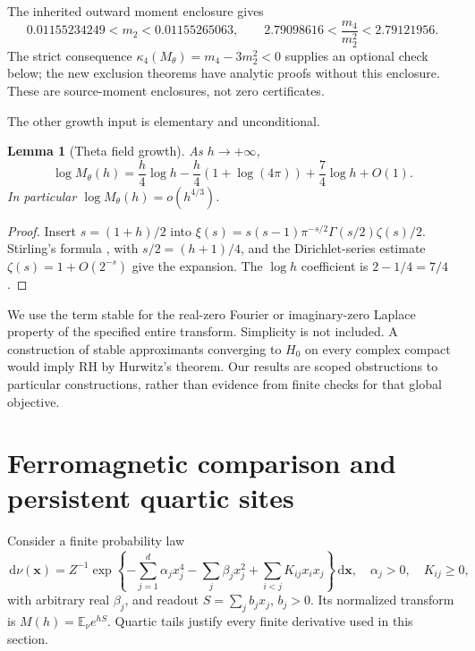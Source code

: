 \documentclass[11pt]{article}
\newtheorem{lemma}[theorem]{Lemma}
\theoremstyle{remark}
\newcommand{\E}{\mathbb E}
\newcommand{\dd}{\,\mathrm d}
\numberwithin{equation}{section}
\begin{document}
The inherited outward moment enclosure \cite{scout} gives
\begin{equation}\label{eq:moments}
 0.01155234249<m_2<0.01155265063,\qquad
 2.79098616<\frac{m_4}{m_2^2}<2.79121956.
\end{equation}
The strict consequence
\(\kappa_4(M_\theta)=m_4-3m_2^2<0\) supplies an optional check below;
the new exclusion theorems have analytic proofs without this enclosure.
These are source-moment enclosures, not zero certificates.

The other growth input is elementary and unconditional.
\begin{lemma}[Theta field growth]\label{lem:theta}
As \(h\to+\infty\),
\begin{equation}\label{eq:theta-growth}
\log M_\theta(h)
 =\frac h4\log h-\frac h4(1+\log(4\pi))
  +\frac74\log h+O(1).
\end{equation}
In particular \(\log M_\theta(h)=o(h^{4/3})\).
\end{lemma}
\begin{proof}
Insert \(s=(1+h)/2\) into
\(\xi(s)=s(s-1)\pi^{-s/2}\Gamma(s/2)\zeta(s)/2\).
Stirling's formula \cite[5.11.1]{dlmf}, with \(s/2=(h+1)/4\), and the
Dirichlet-series estimate \(\zeta(s)=1+O(2^{-s})\) give the expansion.
The \(\log h\) coefficient is \(2-1/4=7/4\).
\end{proof}

We use the term stable for the real-zero Fourier or imaginary-zero Laplace
property of the specified entire transform. Simplicity is not included.
A construction of stable approximants converging to \(H_0\) on every
complex compact would imply RH by Hurwitz's theorem. Our results are
scoped obstructions to particular constructions, rather than evidence
from finite checks for that global objective.

\section{Ferromagnetic comparison and persistent quartic sites}
\label{sec:persistent}

Consider a finite probability law
\begin{equation}\label{eq:network}
\dd\nu(\mathbf x)=Z^{-1}\exp\left\{
 -\sum_{j=1}^d\alpha_jx_j^4-\sum_j\beta_jx_j^2+
 \sum_{i<j}K_{ij}x_ix_j\right\}\dd\mathbf x,
\quad \alpha_j>0,\quad K_{ij}\ge0,
\end{equation}
with arbitrary real \(\beta_j\), and readout \(S=\sum_jb_jx_j\), \(b_j>0\).
Its normalized transform is \(M(h)=\E_\nu e^{hS}\). Quartic tails justify
every finite derivative used in this section.
\end{document}
